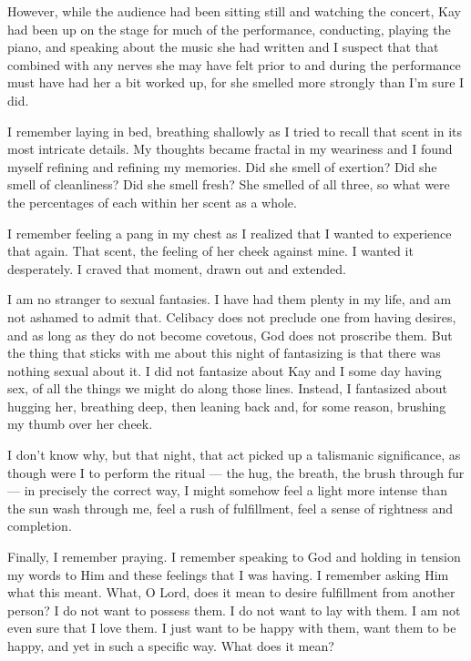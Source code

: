 However, while the audience had been sitting still and watching the concert, Kay had been up on the stage for much of the performance, conducting, playing the piano, and speaking about the music she had written and I suspect that that combined with any nerves she may have felt prior to and during the performance must have had her a bit worked up, for she smelled more strongly than I'm sure I did.

I remember laying in bed, breathing shallowly as I tried to recall that scent in its most intricate details. My thoughts became fractal in my weariness and I found myself refining and refining my memories. Did she smell of exertion? Did she smell of cleanliness? Did she smell fresh? She smelled of all three, so what were the percentages of each within her scent as a whole.

I remember feeling a pang in my chest as I realized that I wanted to experience that again. That scent, the feeling of her cheek against mine. I wanted it desperately. I craved that moment, drawn out and extended.

I am no stranger to sexual fantasies. I have had them plenty in my life, and am not ashamed to admit that. Celibacy does not preclude one from having desires, and as long as they do not become covetous, God does not proscribe them. But the thing that sticks with me about this night of fantasizing is that there was nothing sexual about it. I did not fantasize about Kay and I some day having sex, of all the things we might do along those lines. Instead, I fantasized about hugging her, breathing deep, then leaning back and, for some reason, brushing my thumb over her cheek.

I don't know why, but that night, that act picked up a talismanic significance, as though were I to perform the ritual --- the hug, the breath, the brush through fur --- in precisely the correct way, I might somehow feel a light more intense than the sun wash through me, feel a rush of fulfillment, feel a sense of rightness and completion.

Finally, I remember praying. I remember speaking to God and holding in tension my words to Him and these feelings that I was having. I remember asking Him what this meant. What, O Lord, does it mean to desire fulfillment from another person? I do not want to possess them. I do not want to lay with them. I am not even sure that I love them. I just want to be happy with them, want them to be happy, and yet in such a specific way. What does it mean?

